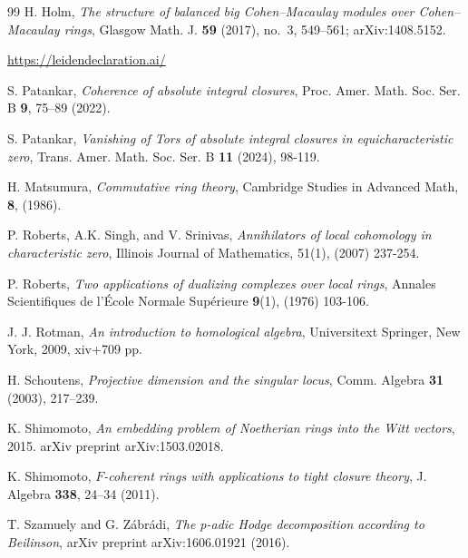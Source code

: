 \documentclass[12pt,reqno]{amsart}
\theoremstyle{definition}
\theoremstyle{remark}
\theoremstyle{cited}
\theoremstyle{remark}
\theoremstyle{citeddef}
\begin{document}
\begin{thebibliography}{99}
		H. Holm,
		\emph{The structure of balanced big Cohen--Macaulay modules over
			Cohen--Macaulay rings},
		Glasgow Math. J. \textbf{59} (2017), no.~3, 549--561;
		arXiv:1408.5152.
		
		\url{https://leidendeclaration.ai/}
		
		S. Patankar,
		\emph{Coherence of absolute integral closures},
		Proc. Amer. Math. Soc. Ser. B {\bf9}, 75--89 (2022).
		
		
		S. Patankar,
		\emph{Vanishing of Tors of absolute integral closures in equicharacteristic zero}, Trans. Amer. Math. Soc. Ser. B \textbf{11} (2024), 98-119.
		
		 H. Matsumura, \emph{Commutative ring theory}, Cambridge Studies in Advanced Math, \textbf{8}, (1986).
		
		P. Roberts, A.K. Singh,  and V.  Srinivas,  \emph{Annihilators of local cohomology in characteristic zero}, Illinois Journal of Mathematics, 51(1),  (2007) 237-254.
		
		P. Roberts, \emph{Two applications of dualizing complexes over local rings}, Annales Scientifiques de l'École Normale Supérieure {\bf 9}(1), (1976) 103-106.
		
		
		J. J. Rotman,
		\emph{An introduction to homological algebra}, 
		Universitext
		Springer, New York, 2009, xiv+709 pp.
		
		 H. Schoutens, \emph{Projective dimension and the singular locus}, Comm. Algebra {\bf 31} (2003), 217–239.
		
		
		
		K.
		Shimomoto,   \emph{An embedding problem of Noetherian rings into the Witt vectors}, 2015. arXiv preprint arXiv:1503.02018.
		
		
		K. Shimomoto,
		\emph{$F$-coherent rings with applications to tight closure theory},
		J. Algebra {\bf338}, 24--34 (2011).
		
		 T.
		Szamuely and G. Zábrádi, \emph{The p-adic Hodge decomposition according to Beilinson},  arXiv preprint arXiv:1606.01921 (2016).
		

\end{thebibliography}
\end{document}
